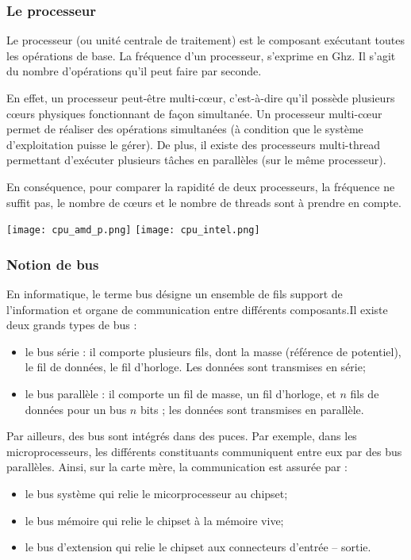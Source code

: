 \subsubsection{Le processeur}
\begin{minipage}[c]{.65\linewidth}
Le processeur (ou unité centrale de traitement) est le composant exécutant toutes les opérations de base. La fréquence d'un processeur, s'exprime en Ghz. Il s'agit du nombre d'opérations qu'il peut faire par seconde.

En effet, un processeur peut-être multi-c\oe{}ur, c'est-à-dire qu'il possède plusieurs c\oe{}urs physiques fonctionnant de façon simultanée. Un processeur multi-c\oe{}ur permet de réaliser des opérations simultanées (à condition que le système d'exploitation puisse le gérer). 
De plus, il existe des processeurs multi-thread permettant d'exécuter plusieurs tâches en parallèles (sur le même processeur). 

En conséquence, pour comparer la rapidité de deux processeurs, la fréquence ne suffit pas, le nombre de cœurs et le nombre de threads sont à prendre en compte. 

\end{minipage}\hfill
\begin{minipage}[c]{.3\linewidth}
\begin{center}
\texttt{[image: cpu\_amd\_p.png]}
\texttt{[image: cpu\_intel.png]}
\end{center}
\end{minipage}
\subsubsection{Notion de bus}
En informatique, le terme bus désigne un ensemble de fils support de l'information et organe de communication entre différents composants.Il existe deux grands types de bus :
\begin{itemize}
\item le bus série : il comporte plusieurs fils, dont la masse (référence de potentiel), le fil de données, le fil d'horloge. Les données sont transmises en série;
\item le bus parallèle : il comporte un fil de masse, un fil d'horloge, et $n$ fils de données pour un bus $n$ bits ; les données sont transmises en parallèle.  
\end{itemize}

Par ailleurs, des bus sont intégrés dans des puces. Par exemple, dans les microprocesseurs, les différents constituants communiquent entre eux par des bus parallèles. Ainsi, sur la carte mère, la communication est assurée par :
\begin{itemize}
\item le bus système qui relie le micorprocesseur au chipset;
\item le bus mémoire qui relie le chipset à la mémoire vive;
\item le bus d'extension qui relie le chipset aux connecteurs d'entrée -- sortie.
\end{itemize}

